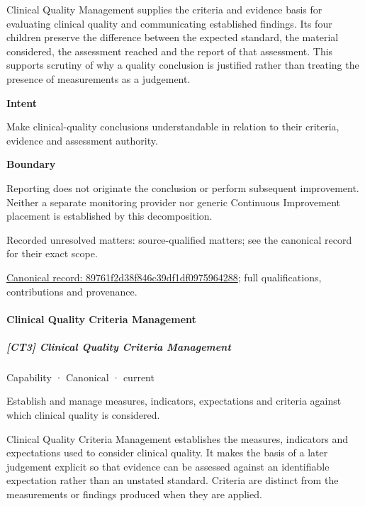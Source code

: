 Clinical Quality Management supplies the criteria and evidence basis for evaluating clinical quality and communicating established findings. Its four children preserve the difference between the expected standard, the material considered, the assessment reached and the report of that assessment. This supports scrutiny of why a quality conclusion is justified rather than treating the presence of measurements as a judgement.



\textbf{Intent}



Make clinical-quality conclusions understandable in relation to their criteria, evidence and assessment authority.



\textbf{Boundary}



Reporting does not originate the conclusion or perform subsequent improvement. Neither a separate monitoring provider nor generic Continuous Improvement placement is established by this decomposition.


{\small Recorded unresolved matters: source-qualified matters; see the canonical record for their exact scope.}\par
{\footnotesize \href{../../../../continuum/strategy/capability/89761f2d38f846c39df1df0975964288.md}{Canonical record: 89761f2d38f846c39df1df0975964288}; full qualifications, contributions and provenance.}\par
\paragraph{Clinical Quality Criteria Management}

\subparagraph{[CT3] Clinical Quality Criteria Management}

\label{element:1f48527a9a7c4382a7f8a660ccb9f29f}
{\small Capability · Canonical · current}\par

Establish and manage measures, indicators, expectations and criteria against which clinical quality is considered.



Clinical Quality Criteria Management establishes the measures, indicators and expectations used to consider clinical quality. It makes the basis of a later judgement explicit so that evidence can be assessed against an identifiable expectation rather than an unstated standard. Criteria are distinct from the measurements or findings produced when they are applied.



